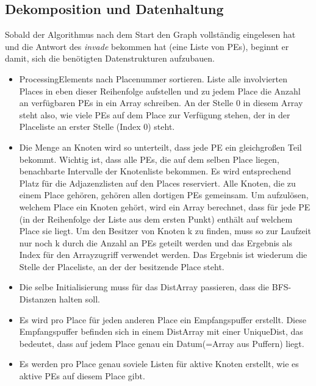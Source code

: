 \subsection{Dekomposition und Datenhaltung} %
\label{sub:dekomposition_und_datenhaltung}

Sobald der Algorithmus nach dem Start den Graph vollständig eingelesen hat und die Antwort des \textit{invade} bekommen hat (eine Liste von PEs), beginnt er damit, sich die benötigten Datenstrukturen aufzubauen.
\begin{itemize}
	\item ProcessingElements nach Placenummer sortieren. Liste alle involvierten Places in eben dieser Reihenfolge aufstellen und zu jedem Place die Anzahl an verfügbaren PEs in ein Array schreiben. An der Stelle 0 in diesem Array steht also, wie viele PEs auf dem Place zur Verfügung stehen, der in der Placeliste an erster Stelle (Index 0) steht.
	\item Die Menge an Knoten wird so unterteilt, dass jede PE ein gleichgroßen Teil bekommt. Wichtig ist, dass alle PEs, die auf dem selben Place liegen, benachbarte Intervalle der Knotenliste bekommen. Es wird entsprechend Platz für die Adjazenzlisten auf den Places reserviert. Alle Knoten, die zu einem Place gehören, gehören allen dortigen PEs gemeinsam. Um aufzulösen, welchem Place ein Knoten gehört, wird ein Array berechnet, dass für jede PE (in der Reihenfolge der Liste aus dem ersten Punkt) enthält auf welchem Place sie liegt. Um den Besitzer von Knoten k zu finden, muss so zur Laufzeit nur noch k durch die Anzahl an PEs geteilt werden und das Ergebnis als Index für den Arrayzugriff verwendet werden. Das Ergebnis ist wiederum die Stelle der Placeliste, an der der besitzende Place steht.
	\item Die selbe Initialisierung muss für das DistArray passieren, dass die BFS-Distanzen halten soll.
	\item Es wird pro Place für jeden anderen Place ein Empfangspuffer erstellt. Diese Empfangspuffer befinden sich in einem DistArray mit einer UniqueDist, das bedeutet, dass auf jedem Place genau ein Datum(=Array aus Puffern) liegt.
	\item Es werden pro Place genau soviele Listen für aktive Knoten erstellt, wie es aktive PEs auf diesem Place gibt.
\end{itemize}

